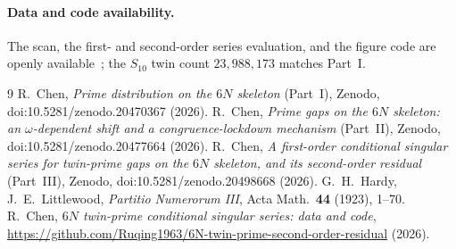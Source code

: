 \documentclass[11pt]{article}
\begin{document}
\paragraph{Data and code availability.}
The scan, the first- and second-order series evaluation, and the figure code are
openly available~\cite{repo}; the $S_{10}$ twin count $23{,}988{,}173$ matches
Part~I.

\begin{thebibliography}{9}
 R.~Chen, \emph{Prime distribution on the $6N$ skeleton} (Part~I),
Zenodo, doi:10.5281/zenodo.20470367 (2026).
 R.~Chen, \emph{Prime gaps on the $6N$ skeleton: an
$\omega$-dependent shift and a congruence-lockdown mechanism} (Part~II), Zenodo,
doi:10.5281/zenodo.20477664 (2026).
 R.~Chen, \emph{A first-order conditional singular series for
twin-prime gaps on the $6N$ skeleton, and its second-order residual} (Part~III),
Zenodo, doi:10.5281/zenodo.20498668 (2026).
 G.~H.~Hardy, J.~E.~Littlewood, \emph{Partitio Numerorum III}, Acta
Math.\ \textbf{44} (1923), 1--70.
 R.~Chen, \emph{$6N$ twin-prime conditional singular series: data
and code}, \url{https://github.com/Ruqing1963/6N-twin-prime-second-order-residual} (2026).
\end{thebibliography}
\end{document}
